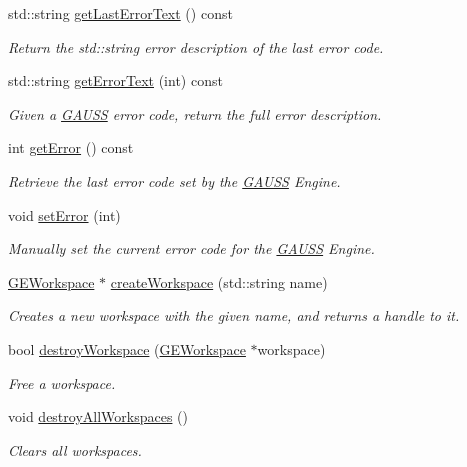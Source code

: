 \begin{DoxyCompactItemize}
std\-::string \hyperlink{class_g_a_u_s_s_adba7b22a8fa8cb49346d2c6840961fee}{get\-Last\-Error\-Text} () const 
\begin{DoxyCompactList}\small\item\em Return the std\-::string error description of the last error code. \end{DoxyCompactList}\item 
std\-::string \hyperlink{class_g_a_u_s_s_a1af840e5998462c0224b4558e17ad790}{get\-Error\-Text} (int) const 
\begin{DoxyCompactList}\small\item\em Given a \hyperlink{class_g_a_u_s_s}{G\-A\-U\-S\-S} error code, return the full error description. \end{DoxyCompactList}\item 
int \hyperlink{class_g_a_u_s_s_a6b145044de3e6ae6df72bb9396b6f7dc}{get\-Error} () const 
\begin{DoxyCompactList}\small\item\em Retrieve the last error code set by the \hyperlink{class_g_a_u_s_s}{G\-A\-U\-S\-S} Engine. \end{DoxyCompactList}\item 
void \hyperlink{class_g_a_u_s_s_a4adc9a33b8be97b1a6592160fea4a4eb}{set\-Error} (int)
\begin{DoxyCompactList}\small\item\em Manually set the current error code for the \hyperlink{class_g_a_u_s_s}{G\-A\-U\-S\-S} Engine. \end{DoxyCompactList}\item 
\hyperlink{class_g_e_workspace}{G\-E\-Workspace} $\ast$ \hyperlink{class_g_a_u_s_s_a93c2f73d4982037cccfeeeb81dbe7dd2}{create\-Workspace} (std\-::string name)
\begin{DoxyCompactList}\small\item\em Creates a new workspace with the given name, and returns a handle to it. \end{DoxyCompactList}\item 
bool \hyperlink{class_g_a_u_s_s_ab73fd6b8f6cfd5abb906b8e4e344c007}{destroy\-Workspace} (\hyperlink{class_g_e_workspace}{G\-E\-Workspace} $\ast$workspace)
\begin{DoxyCompactList}\small\item\em Free a workspace. \end{DoxyCompactList}\item 
void \hyperlink{class_g_a_u_s_s_ab9515a6de5028f18138e6c87e1512c91}{destroy\-All\-Workspaces} ()
\begin{DoxyCompactList}\small\item\em Clears all workspaces. \end{DoxyCompactList}\item 

\end{DoxyCompactItemize}
